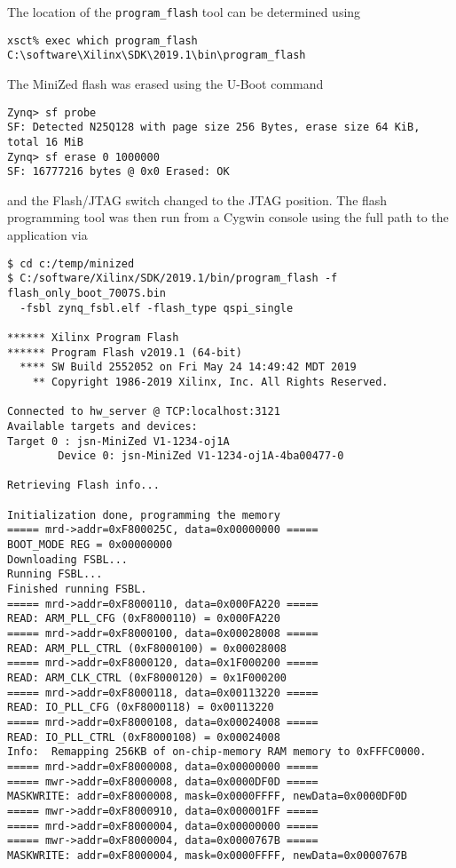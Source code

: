 The location of the \verb+program_flash+ tool can be determined using
%
\begin{verbatim}
xsct% exec which program_flash
C:\software\Xilinx\SDK\2019.1\bin\program_flash
\end{verbatim}
%
The MiniZed flash was erased using the U-Boot command
%
\begin{verbatim}
Zynq> sf probe
SF: Detected N25Q128 with page size 256 Bytes, erase size 64 KiB, total 16 MiB
Zynq> sf erase 0 1000000
SF: 16777216 bytes @ 0x0 Erased: OK
\end{verbatim}
%
and the Flash/JTAG switch changed to the JTAG position. The flash programming
tool was then run from a Cygwin console using the full path to the
application via
%
\begin{verbatim}
$ cd c:/temp/minized
$ C:/software/Xilinx/SDK/2019.1/bin/program_flash -f flash_only_boot_7007S.bin
  -fsbl zynq_fsbl.elf -flash_type qspi_single

****** Xilinx Program Flash
****** Program Flash v2019.1 (64-bit)
  **** SW Build 2552052 on Fri May 24 14:49:42 MDT 2019
    ** Copyright 1986-2019 Xilinx, Inc. All Rights Reserved.

Connected to hw_server @ TCP:localhost:3121
Available targets and devices:
Target 0 : jsn-MiniZed V1-1234-oj1A
        Device 0: jsn-MiniZed V1-1234-oj1A-4ba00477-0

Retrieving Flash info...

Initialization done, programming the memory
===== mrd->addr=0xF800025C, data=0x00000000 =====
BOOT_MODE REG = 0x00000000
Downloading FSBL...
Running FSBL...
Finished running FSBL.
===== mrd->addr=0xF8000110, data=0x000FA220 =====
READ: ARM_PLL_CFG (0xF8000110) = 0x000FA220
===== mrd->addr=0xF8000100, data=0x00028008 =====
READ: ARM_PLL_CTRL (0xF8000100) = 0x00028008
===== mrd->addr=0xF8000120, data=0x1F000200 =====
READ: ARM_CLK_CTRL (0xF8000120) = 0x1F000200
===== mrd->addr=0xF8000118, data=0x00113220 =====
READ: IO_PLL_CFG (0xF8000118) = 0x00113220
===== mrd->addr=0xF8000108, data=0x00024008 =====
READ: IO_PLL_CTRL (0xF8000108) = 0x00024008
Info:  Remapping 256KB of on-chip-memory RAM memory to 0xFFFC0000.
===== mrd->addr=0xF8000008, data=0x00000000 =====
===== mwr->addr=0xF8000008, data=0x0000DF0D =====
MASKWRITE: addr=0xF8000008, mask=0x0000FFFF, newData=0x0000DF0D
===== mwr->addr=0xF8000910, data=0x000001FF =====
===== mrd->addr=0xF8000004, data=0x00000000 =====
===== mwr->addr=0xF8000004, data=0x0000767B =====
MASKWRITE: addr=0xF8000004, mask=0x0000FFFF, newData=0x0000767B


\end{verbatim}
